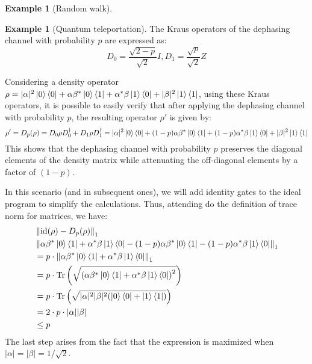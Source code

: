 \documentclass[10pt,a4paper]{amsart}
\theoremstyle{definition}
\theoremstyle{definition}
\newtheorem{example}[definition]{Example}
\theoremstyle{definition}
\theoremstyle{definition}
\theoremstyle{definition}
\theoremstyle{definition}
\begin{document}
\begin{example}[Random walk]
\begin{example}[Quantum teleportation]
     The Kraus operators of the dephasing channel with probability $p$ are expressed as:
     \begin{equation*}
          D_{0}= \frac{\sqrt{2-p}}{\sqrt{2}} I,  D_{1}= \frac{\sqrt{p}}{\sqrt{2}} Z
     \end{equation*}
     
     Considering a density operator $\rho=|\alpha|^{2} \ket{0} \bra{0} + \alpha \beta^{*} \ket{0} \bra{1}+ \alpha^{*} \beta \ket{1} \bra{0} + |\beta|^{2} \ket{1} \bra{1}$, using these Kraus operators, it is possible to easily verify  that after applying the dephasing channel with probability $p$, the resulting operator $\rho'$ is given by: 
     \begin{equation*} 
          \rho' = D_p(\rho)= D_{0} \rho D_{0}^{\dag} + D_{1} \rho D_{1}^{\dag} = |\alpha|^{2} \ket{0} \bra{0} +  (1-p) \alpha \beta^{*} \ket{0} \bra{1}+  (1-p) \alpha^{*}  \beta \ket{1} \bra{0} + |\beta|^{2} \ket{1} \bra{1}
     \end{equation*}
     This shows that the dephasing channel with probability $p$ preserves the diagonal elements of the density matrix while attenuating the off-diagonal elements by a factor of $(1-p)$.

     In this scenario (and in subsequent ones), we will add identity gates to the ideal program to simplify the calculations. Thus, attending do the definition of trace norm for matrices, we have:
     \begin{align*}
      & \left\lVert  \mathrm{id}(\rho) - D_{p}(\rho) \right\rVert_{1} \\
      & \left\lVert  \alpha \beta^{*} \ket{0} \bra{1}+ \alpha^{*} \beta \ket{1} \bra{0}  -   (1-p) \alpha \beta^{*} \ket{0} \bra{1}-  (1-p) \alpha^{*}  \beta \ket{1} \bra{0}  \right\rVert_{1} \\
      & = p \cdot  \left\lVert  \alpha \beta^{*} \ket{0} \bra{1} + \alpha^{*}  \beta \ket{1} \bra{0}  \right\rVert_{1} \\
      & = p \cdot \text{Tr} \left(\sqrt{\left( \alpha \beta^{*} \ket{0} \bra{1} + \alpha^{*}  \beta \ket{1} \bra{0} \right)^2} \right) \\
      & = p \cdot  \text{Tr} \left(\sqrt{|\alpha|^{2}|\beta|^{2} (\ket{0} \bra{0}+ \ket{1} \bra{1})  } \right) \\
      & = 2 \cdot p \cdot |\alpha||\beta| \\
      & \leq p \\
     \end{align*}
     The last step arises from the fact that the expression is maximized when $|\alpha|=|\beta|=1/\sqrt{2}$.


\end{example}
\end{example}
\end{document}
